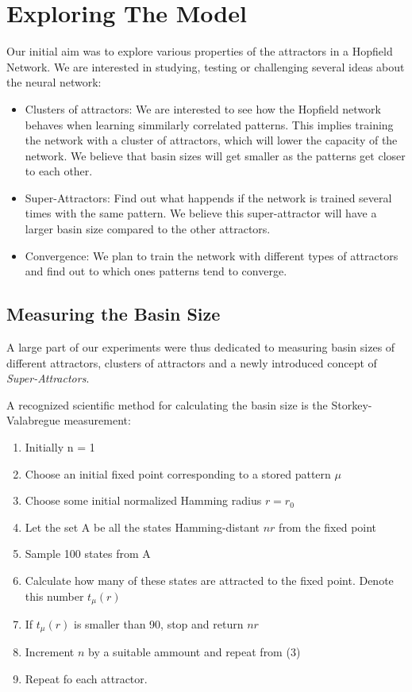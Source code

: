 \chapter{Exploring The Model}


Our initial aim was to explore various properties of the attractors in a Hopfield Network. We are interested in studying, testing or challenging several ideas about the neural network:
\begin{itemize}
 \item Clusters of attractors: We are interested to see how the Hopfield network behaves when learning simmilarly correlated patterns. This implies training the network with a cluster of attractors, which will lower the capacity of the network. We believe that basin sizes will get smaller as the patterns get closer to each other. 
 \item Super-Attractors: Find out what happends if the network is trained several times with the same pattern. We believe this super-attractor will have a larger basin size compared to the other attractors.
 \item Convergence: We plan to train the network with different types of attractors and find out to which ones patterns tend to converge.  
\end{itemize}


\section{Measuring the Basin Size}

 A large part of our experiments were thus dedicated to measuring basin sizes of different attractors, clusters of attractors and a newly introduced concept of \emph{Super-Attractors}. 
 
 A recognized scientific method for calculating the basin size is the Storkey-Valabregue measurement:
 
 \begin{enumerate}
  \item Initially n = 1
  \item Choose an initial fixed point corresponding to a stored pattern \(\mu\)
  \item Choose some initial normalized Hamming radius \(r=r_{0}\)
  \item Let the set A be all the states Hamming-distant \( nr \) from the fixed point
  \item Sample 100 states from A
  \item Calculate how many of these states are attracted to the fixed point. Denote this number \( t_{\mu}(r) \)
  \item If \( t_{\mu}(r) \) is smaller than 90, stop and return \(nr\)
  \item Increment \(n\) by a suitable ammount and repeat from (3)
  \item Repeat fo each attractor.
 \end{enumerate}

